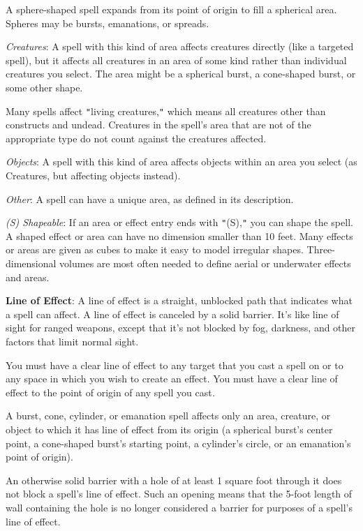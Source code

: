 A sphere-shaped spell expands from its point of origin to fill a spherical area. Spheres may be bursts, emanations, or spreads.
				
\textit{Creatures}: A spell with this kind of area affects creatures directly (like a targeted spell), but it affects all creatures in an area of some kind rather than individual creatures you select. The area might be a spherical burst, a cone-shaped burst, or some other shape.
				
Many spells affect \texttt{{}"{}}living creatures,\texttt{{}"{}} which means all creatures other than constructs and undead. Creatures in the spell's area that are not of the appropriate type do not count against the creatures affected.
				
\textit{Objects}: A spell with this kind of area affects objects within an area you select (as Creatures, but affecting objects instead).
				
\textit{Other}: A spell can have a unique area, as defined in its description.
				
\textit{(S) Shapeable}: If an area or effect entry ends with \texttt{{}"{}}(S),\texttt{{}"{}} you can shape the spell. A shaped effect or area can have no dimension smaller than 10 feet. Many effects or areas are given as cubes to make it easy to model irregular shapes. Three-dimensional volumes are most often needed to define aerial or underwater effects and areas.
				
\textbf{Line of Effect}: A line of effect is a straight, unblocked path that indicates what a spell can affect. A line of effect is canceled by a solid barrier. It's like line of sight for ranged weapons, except that it's not blocked by fog, darkness, and other factors that limit normal sight.
				
You must have a clear line of effect to any target that you cast a spell on or to any space in which you wish to create an effect. You must have a clear line of effect to the point of origin of any spell you cast\textit{.}
				
A burst, cone, cylinder, or emanation spell affects only an area, creature, or object to which it has line of effect from its origin (a spherical burst's center point, a cone-shaped burst's starting point, a cylinder's circle, or an emanation's point of origin).
				
An otherwise solid barrier with a hole of at least 1 square foot through it does not block a spell's line of effect. Such an opening means that the 5-foot length of wall containing the hole is no longer considered a barrier for purposes of a spell's line of effect.
				
